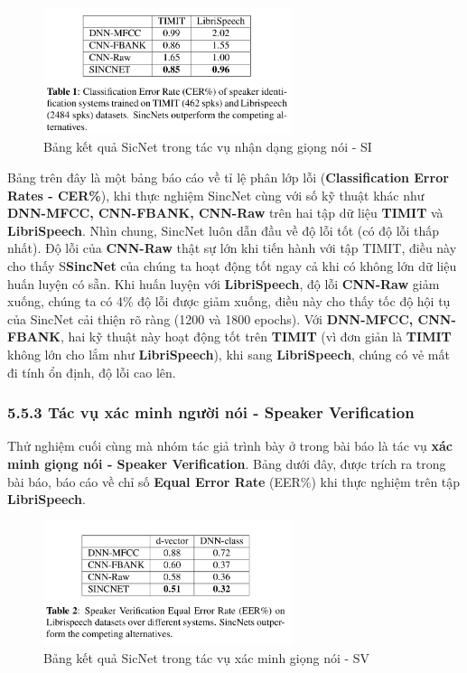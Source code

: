 \documentclass{article}
\begin{document}
	\begin{figure}[H]
		\centering
		\includegraphics[width=0.65\textwidth]{images/performance_speaker_identification.png}
		\caption{Bảng kết quả SicNet trong tác vụ nhận dạng giọng nói - SI}
		\label{fig:writing-thesis}
	\end{figure}
	Bảng trên đây là một bảng báo cáo về tỉ lệ phân lớp lỗi (\textbf{Classification Error Rates - CER\%}), khi thực nghiệm SincNet cùng với số kỹ thuật khác như \textbf{DNN-MFCC, CNN-FBANK, CNN-Raw} trên hai tập dữ liệu \textbf{TIMIT} và \textbf{LibriSpeech}. Nhìn chung, SincNet luôn dẫn đầu về độ lỗi tốt (có độ lỗi thấp nhất). Độ lỗi của \textbf{CNN-Raw} thật sự lớn khi tiến hành với tập TIMIT, điều này cho thấy S\textbf{SincNet} của chúng ta hoạt động tốt ngay cả khi có không lớn dữ liệu huấn luyện có sẵn. Khi huấn luyện với \textbf{LibriSpeech}, độ lỗi \textbf{CNN-Raw} giảm xuống, chúng ta có 4\% độ lỗi được giảm xuống, điều này cho thấy tốc độ hội tụ của SincNet cải thiện rõ ràng (1200 và 1800 epochs). Với \textbf{DNN-MFCC, CNN-FBANK}, hai kỹ thuật này hoạt động tốt trên \textbf{TIMIT} (vì đơn giản là \textbf{TIMIT} không lớn cho lắm như \textbf{LibriSpeech}), khi sang \textbf{LibriSpeech}, chúng có vẻ mất đi tính ổn định, độ lỗi cao lên.
	
	\subsubsection{5.5.3 Tác vụ xác minh người nói - Speaker Verification}
	Thử nghiệm cuối cùng mà nhóm tác giả trình bày ở trong bài báo là tác vụ \textbf{xác minh giọng nói - Speaker Verification}. Bảng dưới đây, được trích ra trong bài báo, báo cáo về chỉ số \textbf{Equal Error Rate} (EER\%) khi thực nghiệm trên tập \textbf{LibriSpeech}. 
	\begin{figure}[H]
		\centering
		\includegraphics[width=0.65\textwidth]{images/performance_speaker_verification.png}
		\caption{Bảng kết quả SicNet trong tác vụ xác minh giọng nói - SV}
		\label{fig:writing-thesis}
	\end{figure}
	
\end{document}
